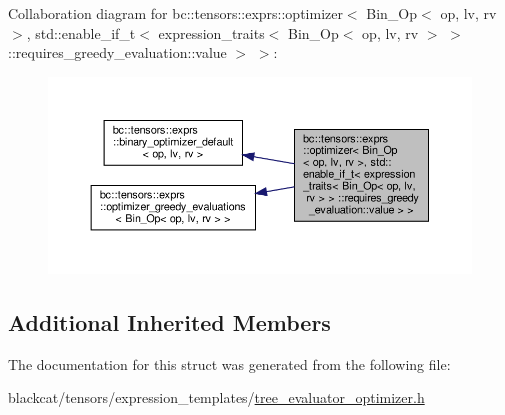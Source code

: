 Collaboration diagram for bc\+:\+:tensors\+:\+:exprs\+:\+:optimizer$<$ Bin\+\_\+\+Op$<$ op, lv, rv $>$, std\+:\+:enable\+\_\+if\+\_\+t$<$ expression\+\_\+traits$<$ Bin\+\_\+\+Op$<$ op, lv, rv $>$ $>$ \+:\+:requires\+\_\+greedy\+\_\+evaluation\+:\+:value $>$ $>$\+:\nopagebreak
\begin{figure}[H]
\begin{center}
\leavevmode
\includegraphics[width=350pt]{structbc_1_1tensors_1_1exprs_1_1optimizer_3_01Bin__Op_3_01op_00_01lv_00_01rv_01_4_00_01std_1_1ene9fce802972e5d4521c695ce8ceea2df}
\end{center}
\end{figure}
\subsection*{Additional Inherited Members}


The documentation for this struct was generated from the following file\+:\begin{DoxyCompactItemize}
\item 
blackcat/tensors/expression\+\_\+templates/\hyperlink{tree__evaluator__optimizer_8h}{tree\+\_\+evaluator\+\_\+optimizer.\+h}\end{DoxyCompactItemize}
